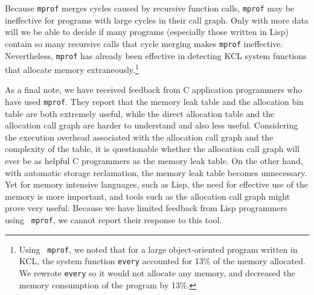 Because {\tt mprof} merges cycles caused by recursive function calls,
{\tt mprof} may be ineffective for programs with large cycles in their
call graph.  Only with more data will we be able to decide if many
programs (especially those written in Lisp) contain so many recursive
calls that cycle merging makes {\tt mprof} ineffective.  Nevertheless,
{\tt mprof} has already been effective in detecting KCL system
functions that allocate memory extraneously.\footnote{Using {\tt
mprof}, we noted that for a large object-oriented program written in
KCL, the system function {\tt every} accounted for 13\% of the memory
allocated.  We rewrote {\tt every} so it would not allocate any
memory, and decreased the memory consumption of the program by 13\%.}

As a final note, we have received feedback from C application
programmers who have used {\tt mprof}.  They report that the memory
leak table and the allocation bin table are both extremely useful,
while the direct allocation table and the allocation call graph are
harder to understand and also less useful.  Considering the execution
overhead associated with the allocation call graph and the complexity
of the table, it is questionable whether the allocation call graph
will ever be as helpful C programmers as the memory leak table.  On
the other hand, with automatic storage reclamation, the memory leak
table becomes unnecessary.  Yet for memory intensive languages, such
as Lisp, the need for effective use of the memory is more important,
and tools such as the allocation call graph might prove very useful.
Because we have limited feedback from Lisp programmers using {\tt
mprof}, we cannot report their response to this tool.





% 
